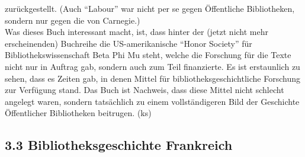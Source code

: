 \documentclass[a4paper,
fontsize=11pt,
oneside,
numbers=noperiodatend,
parskip=half-,
bibliography=totoc,
final
]{scrartcl}
\begin{document}
zurückgestellt. (Auch ``Labour'' war nicht per se gegen Öffentliche
Bibliotheken, sondern nur gegen die von Carnegie.)\\
Was dieses Buch interessant macht, ist, dass hinter der (jetzt nicht
mehr erscheinenden) Buchreihe die US-amerikanische ``Honor Society'' für
Bibliothekswissenschaft Beta Phi Mu steht, welche die Forschung für die
Texte nicht nur in Auftrag gab, sondern auch zum Teil finanzierte. Es
ist erstaunlich zu sehen, dass es Zeiten gab, in denen Mittel für
bibliotheksgeschichtliche Forschung zur Verfügung stand. Das Buch ist
Nachweis, dass diese Mittel nicht schlecht angelegt waren, sondern
tatsächlich zu einem vollständigeren Bild der Geschichte Öffentlicher
Bibliotheken beitrugen. (ks)

\hypertarget{bibliotheksgeschichte-frankreich}{%
\subsection{3.3 Bibliotheksgeschichte
Frankreich}\label{bibliotheksgeschichte-frankreich}}
\end{document}
